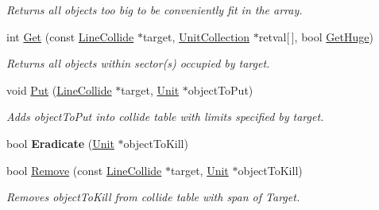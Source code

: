 \begin{DoxyCompactItemize}
\begin{DoxyCompactList}\small\item\em Returns all objects too big to be conveniently fit in the array. \end{DoxyCompactList}\item 
int \hyperlink{classUnitHash3d_ae6e27d752d119b6fb7c8d8bc7e2a770a}{Get} (const \hyperlink{structLineCollide}{Line\+Collide} $\ast$target, \hyperlink{classUnitCollection}{Unit\+Collection} $\ast$retval\mbox{[}$\,$\mbox{]}, bool \hyperlink{classUnitHash3d_af4af4ef118380adeadd72fe201beb00a}{Get\+Huge})\hypertarget{classUnitHash3d_ae6e27d752d119b6fb7c8d8bc7e2a770a}{}\label{classUnitHash3d_ae6e27d752d119b6fb7c8d8bc7e2a770a}

\begin{DoxyCompactList}\small\item\em Returns all objects within sector(s) occupied by target. \end{DoxyCompactList}\item 
void \hyperlink{classUnitHash3d_a0889f24703f42b1a0096aba7d8781091}{Put} (\hyperlink{structLineCollide}{Line\+Collide} $\ast$target, \hyperlink{classUnit}{Unit} $\ast$object\+To\+Put)\hypertarget{classUnitHash3d_a0889f24703f42b1a0096aba7d8781091}{}\label{classUnitHash3d_a0889f24703f42b1a0096aba7d8781091}

\begin{DoxyCompactList}\small\item\em Adds object\+To\+Put into collide table with limits specified by target. \end{DoxyCompactList}\item 
bool {\bfseries Eradicate} (\hyperlink{classUnit}{Unit} $\ast$object\+To\+Kill)\hypertarget{classUnitHash3d_adb7d24a04568b3db7eb144b6d4af7a2b}{}\label{classUnitHash3d_adb7d24a04568b3db7eb144b6d4af7a2b}

\item 
bool \hyperlink{classUnitHash3d_a44a5e533ffa1243911d016637eff36a0}{Remove} (const \hyperlink{structLineCollide}{Line\+Collide} $\ast$target, \hyperlink{classUnit}{Unit} $\ast$object\+To\+Kill)\hypertarget{classUnitHash3d_a44a5e533ffa1243911d016637eff36a0}{}\label{classUnitHash3d_a44a5e533ffa1243911d016637eff36a0}

\begin{DoxyCompactList}\small\item\em Removes object\+To\+Kill from collide table with span of Target. \end{DoxyCompactList}\end{DoxyCompactItemize}
